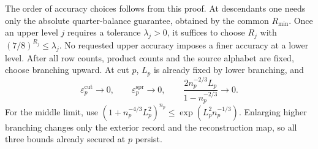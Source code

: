 The order of accuracy choices follows from this proof.  At descendants one
needs only the absolute quarter-balance guarantee, obtained by the common
$R_{\min}$.  Once an upper level $j$ requires a tolerance $\lambda_j>0$, it
suffices to choose $R_j$ with $(7/8)^{R_j}\le\lambda_j$.  No requested upper
accuracy imposes a finer accuracy at a lower level.  After all row counts,
product counts and the source alphabet are fixed, choose branching upward.
At cut $p$, $L_p$ is already fixed by lower branching, and
\[
 \varepsilon_p^{\mathrm{cut}}\longrightarrow0,
 \qquad
 \varepsilon_p^{\mathrm{spr}}\longrightarrow0,
 \qquad
 \frac{2n_p^{-2/3}L_p}{1-n_p^{-2/3}}\longrightarrow0.
\]
For the middle limit, use
$(1+n_p^{-4/3}L_p^2)^{n_p}\le\exp(L_p^2n_p^{-1/3})$.
Enlarging higher branching changes only the exterior record and the
reconstruction map, so all three bounds already secured at $p$ persist.
